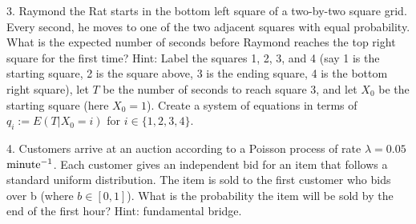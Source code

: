 \documentclass{article}
\begin{document}
3. Raymond the Rat starts in the bottom left square of a two-by-two square grid. Every second, he moves to one of the two adjacent squares with equal probability. What is the expected number of seconds before Raymond reaches the top right square for the first time? Hint: Label the squares 1, 2, 3, and 4 (say 1 is the starting square, 2 is the square above, 3 is the ending square, 4 is the bottom right square), let $T$ be the number of seconds to reach square 3, and let $X_0$ be the starting square (here $X_0=1$). Create a system of equations in terms of $q_i:=E(T|X_0=i)$ for $i \in \{1,2,3,4\}$. 


4. Customers arrive at an auction according to a Poisson process of rate $\lambda = 0.05$ $\textnormal{minute}^{-1}$. Each customer gives an independent bid for an item that follows a standard uniform distribution. The item is sold to the first customer who bids over b (where $b \in [0,1]$). What is the probability the item will be sold by the end of the first hour? Hint: fundamental bridge.
\end{document}
